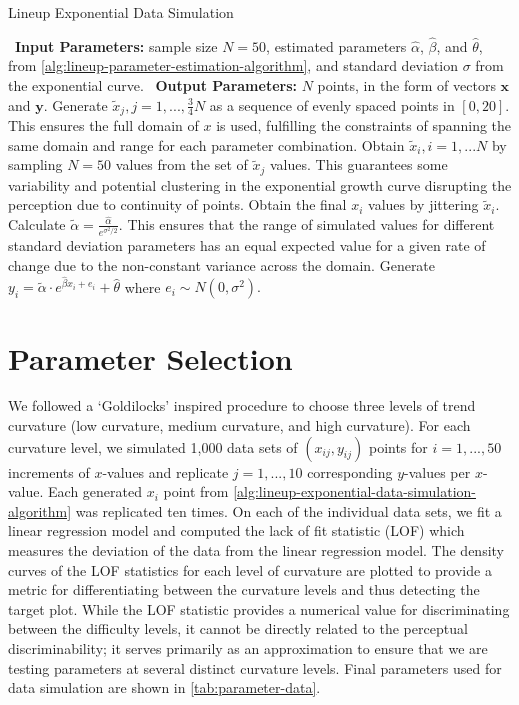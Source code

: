 \documentclass[print]{nuthesis}
\begin{document}
\begin{algorithm}
  \caption{Lineup Exponential Data Simulation}\label{alg:lineup-exponential-data-simulation-algorithm}
  \begin{algorithmic}[1]
    \Statex \textbullet~\textbf{Input Parameters:} sample size $N = 50$, estimated parameters $\hat\alpha$, $\hat\beta$, and $\hat\theta$, from \cref{alg:lineup-parameter-estimation-algorithm}, and standard deviation $\sigma$ from the exponential curve.
    \Statex \textbullet~\textbf{Output Parameters:} $N$ points, in the form of vectors $\mathbf{x}$ and $\mathbf{y}$.
    \State Generate $\tilde x_j, j = 1,..., \frac{3}{4}N$ as a sequence of evenly spaced points in $[0,20]$. This ensures the full domain of $x$ is used, fulfilling the constraints of spanning the same domain and range for each parameter combination.
    \State Obtain $\tilde x_i, i = 1,...N$ by sampling $N = 50$ values from the set of $\tilde x_j$ values. This guarantees some variability and potential clustering in the exponential growth curve disrupting the perception due to continuity of points.
    \State Obtain the final $x_i$ values by jittering $\tilde x_i$.
    \State Calculate $\tilde\alpha = \frac{\hat\alpha}{e^{\sigma^2/2}}.$ This ensures that the range of simulated values for different standard deviation parameters has an equal expected value for a given rate of change due to the non-constant variance across the domain.
    \State Generate $y_i = \tilde\alpha\cdot e^{\hat\beta x_i + e_i}+\hat\theta$ where $e_i\sim N(0,\sigma^2).$
  \end{algorithmic}
\end{algorithm}

\hypertarget{lineups-parameter-selection}{%
\section{Parameter Selection}\label{lineups-parameter-selection}}

We followed a `Goldilocks' inspired procedure to choose three levels of trend curvature (low curvature, medium curvature, and high curvature). For each curvature level, we simulated 1,000 data sets of \((x_{ij}, y_{ij})\) points for \(i = 1,...,50\) increments of \(x\)-values and replicate \(j = 1,...,10\) corresponding \(y\)-values per \(x\)-value.
Each generated \(x_i\) point from \cref{alg:lineup-exponential-data-simulation-algorithm} was replicated ten times.
On each of the individual data sets, we fit a linear regression model and computed the lack of fit statistic (LOF) which measures the deviation of the data from the linear regression model.
The density curves of the LOF statistics for each level of curvature are plotted  to provide a metric for differentiating between the curvature levels and thus detecting the target plot.
While the LOF statistic provides a numerical value for discriminating between the difficulty levels, it cannot be directly related to the perceptual discriminability; it serves primarily as an approximation to ensure that we are testing parameters at several distinct curvature levels.
Final parameters used for data simulation are shown in \cref{tab:parameter-data}.
\end{document}
